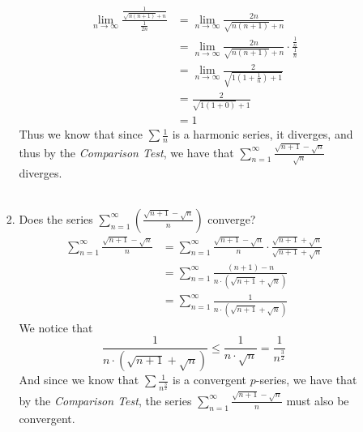 \documentclass[12pt,letterpaper]{article}
\newcommand{\limx}[2]{\displaystyle\lim\limits_{#1 \to #2}}
\theoremstyle{case}
\theoremstyle{definition}
\begin{document}
\begin{enumerate}
\begin{enumerate}
\begin{enumerate}
				\begin{align*}
					\limx{n}{\infty} \frac{\frac{1}{\sqrt{n(n+1)}+n}}{\frac{1}{2n}} &= \limx{n}{\infty} \frac{2n}{\sqrt{n(n+1)}+n} \\
					&= \limx{n}{\infty} \frac{2n}{\sqrt{n(n+1)}+n} \cdot \frac{\frac{1}{n}}{\frac{1}{n}} \\
					&= \limx{n}{\infty} \frac{2}{\sqrt{1(1+\frac{1}{n})+1}} \\
					&= \frac{2}{\sqrt{1(1+0)}+1} \\
					&= 1
				\end{align*}
				Thus we know that since $\sum \frac{1}{n}$ is a harmonic series, it diverges, and thus by the \textit{Comparison Test}, we have that $\displaystyle\sum_{n=1}^{\infty} \frac{\sqrt{n+1}-\sqrt{n}}{\sqrt{n}}$ diverges.\\\\
				
				\item Does the series $\displaystyle\sum_{n=1}^{\infty} \left(\frac{\sqrt{n+1}-\sqrt{n}}{n}\right)$ converge?
				\begin{align*}
					\sum_{n=1}^{\infty} \frac{\sqrt{n+1}-\sqrt{n}}{n} &= \sum_{n=1}^{\infty} \frac{\sqrt{n+1}-\sqrt{n}}{n} \cdot \frac{\sqrt{n+1}+\sqrt{n}}{\sqrt{n+1}+\sqrt{n}} \\
					&= \sum_{n=1}^{\infty} \frac{(n+1)-n}{n\cdot (\sqrt{n+1}+\sqrt{n})} \\
					&= \sum_{n=1}^{\infty} \frac{1}{n\cdot(\sqrt{n+1}+\sqrt{n})}
				\end{align*}
				We notice that 
				\[\frac{1}{n \cdot (\sqrt{n+1}+\sqrt{n})} \leq \frac{1}{n \cdot \sqrt{n}}=\frac{1}{n^{\frac{3}{2}}}\]
				And since we know that $\displaystyle\sum \frac{1}{n^{\frac{3}{2}}}$ is a convergent $p$-series, we have that by the \textit{Comparison Test}, the series $\displaystyle\sum_{n=1}^{\infty} \frac{\sqrt{n+1}-\sqrt{n}}{n}$ must also be convergent.
			\end{enumerate}
		\end{enumerate}
	

\end{enumerate}
\end{document}
